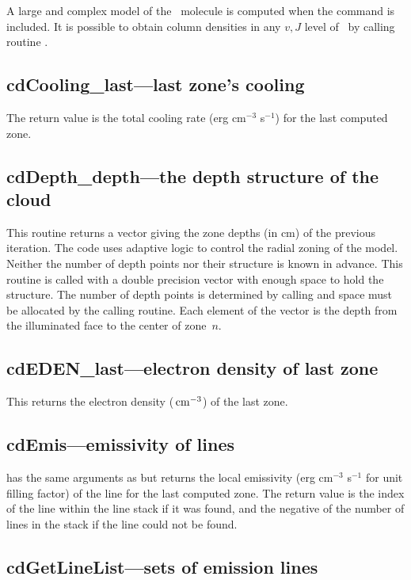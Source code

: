 A large and complex model of the \htwo\ molecule is computed when the
 command is included.
It is possible to obtain column densities in any
$v,J$ level of \htwo\ by calling routine .

\subsection{cdCooling\_last---last zone's cooling}

The return value is the total cooling rate (erg cm$^{-3}$ s$^{-1}$)
for the last computed zone.

\subsection{cdDepth\_depth---the depth structure of the cloud}

This routine returns a vector giving the zone depths (in cm) of the
previous iteration.
The code uses adaptive logic to control the radial
zoning of the model.
Neither the number of depth points nor their structure
is known in advance.
This routine is called with a double precision vector
with enough space to hold the structure.
The number of depth points is
determined by calling  and space must be allocated by the calling
routine.
Each element of the vector is the depth from the illuminated face
to the center of zone~$n$.

\subsection{cdEDEN\_last---electron density of last zone}

This returns the electron density (${\rm\thinspace cm^{-3}}$) of the last zone.

\subsection{cdEmis---emissivity of lines}

 has the same arguments as 
but returns the
local emissivity (erg cm$^{-3}$ s$^{-1}$ for unit filling factor) of the line for
the last computed zone.
The return value is the index of the line within
the line stack if it was found, and the negative of the number of lines
in the stack if the line could not be found.

\subsection{cdGetLineList---sets of emission lines}

